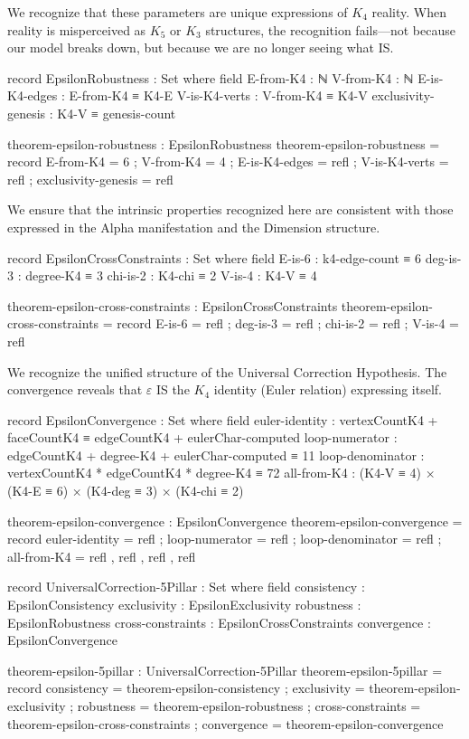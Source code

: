 \documentclass[11pt,a4paper]{book}
\begin{document}
We recognize that these parameters are unique expressions of $K_4$ reality. When reality is misperceived as $K_5$ or $K_3$ structures, the recognition fails—not because our model breaks down, but because we are no longer seeing what IS.

\begin{code}
record EpsilonRobustness : Set where
  field
    E-from-K4     : ℕ
    V-from-K4     : ℕ
    E-is-K4-edges : E-from-K4 ≡ K4-E
    V-is-K4-verts : V-from-K4 ≡ K4-V
    exclusivity-genesis : K4-V ≡ genesis-count

theorem-epsilon-robustness : EpsilonRobustness
theorem-epsilon-robustness = record
  { E-from-K4 = 6
  ; V-from-K4 = 4
  ; E-is-K4-edges = refl
  ; V-is-K4-verts = refl
  ; exclusivity-genesis = refl
  }
\end{code}

We ensure that the intrinsic properties recognized here are consistent with those expressed in the Alpha manifestation and the Dimension structure.

\begin{code}
record EpsilonCrossConstraints : Set where
  field
    E-is-6 : k4-edge-count ≡ 6
    deg-is-3 : degree-K4 ≡ 3
    chi-is-2 : K4-chi ≡ 2
    V-is-4 : K4-V ≡ 4

theorem-epsilon-cross-constraints : EpsilonCrossConstraints
theorem-epsilon-cross-constraints = record
  { E-is-6 = refl
  ; deg-is-3 = refl
  ; chi-is-2 = refl
  ; V-is-4 = refl
  }
\end{code}

We recognize the unified structure of the Universal Correction Hypothesis.
The convergence reveals that $\varepsilon$ IS the $K_4$ identity (Euler relation) expressing itself.

\begin{code}
record EpsilonConvergence : Set where
  field
    euler-identity : vertexCountK4 + faceCountK4 ≡ edgeCountK4 + eulerChar-computed
    loop-numerator : edgeCountK4 + degree-K4 + eulerChar-computed ≡ 11
    loop-denominator : vertexCountK4 * edgeCountK4 * degree-K4 ≡ 72
    all-from-K4 : (K4-V ≡ 4) × (K4-E ≡ 6) × (K4-deg ≡ 3) × (K4-chi ≡ 2)

theorem-epsilon-convergence : EpsilonConvergence
theorem-epsilon-convergence = record
  { euler-identity = refl
  ; loop-numerator = refl
  ; loop-denominator = refl
  ; all-from-K4 = refl , refl , refl , refl
  }

record UniversalCorrection-5Pillar : Set where
  field
    consistency : EpsilonConsistency
    exclusivity : EpsilonExclusivity
    robustness : EpsilonRobustness
    cross-constraints : EpsilonCrossConstraints
    convergence : EpsilonConvergence

theorem-epsilon-5pillar : UniversalCorrection-5Pillar
theorem-epsilon-5pillar = record
  { consistency = theorem-epsilon-consistency
  ; exclusivity = theorem-epsilon-exclusivity
  ; robustness = theorem-epsilon-robustness
  ; cross-constraints = theorem-epsilon-cross-constraints
  ; convergence = theorem-epsilon-convergence
  }
\end{code}
\end{document}

